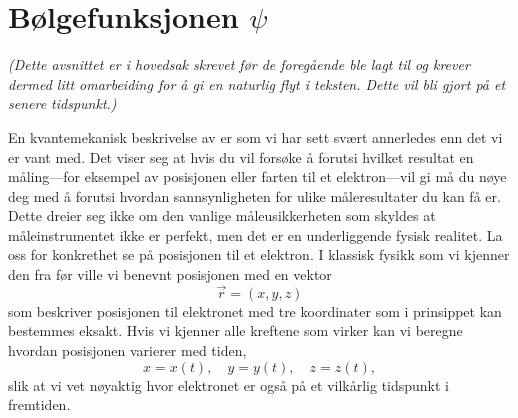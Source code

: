 \section{Bølgefunksjonen $\psi$}
\label{sec:kvante:psi}
\emph{(Dette avsnittet er i hovedsak skrevet før de foregående ble lagt til og krever dermed litt omarbeiding for å gi en naturlig flyt i teksten. Dette vil bli gjort på et senere tidspunkt.)} \\
\vspace{12pt}

En kvantemekanisk beskrivelse av er som vi har sett svært annerledes enn det vi er vant med. Det viser seg at hvis du vil forsøke å forutsi hvilket resultat en måling---for eksempel av posisjonen eller farten til et elektron---vil gi må du nøye deg med å forutsi hvordan sannsynligheten for ulike måleresultater du kan få er. Dette dreier seg ikke om den vanlige måleusikkerheten som skyldes at måleinstrumentet ikke er perfekt, men det er en underliggende fysisk realitet. La oss for konkrethet se på posisjonen til et elektron. I klassisk fysikk som vi kjenner den fra før ville vi benevnt posisjonen med en vektor
\begin{displaymath}
	\vec{r} = (x,y,z)
\end{displaymath}
som beskriver posisjonen til elektronet med tre koordinater som i prinsippet kan bestemmes eksakt. Hvis vi kjenner alle kreftene som virker kan vi beregne hvordan posisjonen varierer med tiden,
\begin{displaymath}
	x = x(t),\quad y = y(t),\quad z=z(t),
\end{displaymath}
slik at vi vet nøyaktig hvor elektronet er også på et vilkårlig tidspunkt i fremtiden.

